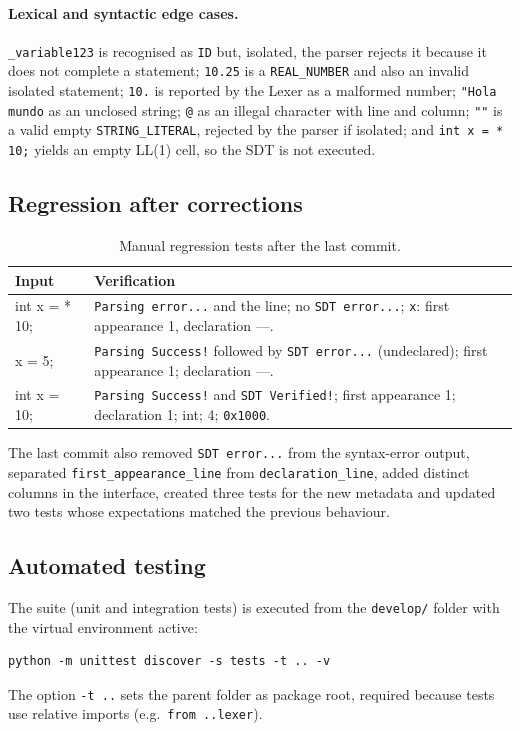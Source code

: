 \documentclass[11pt,a4paper]{article}
\begin{document}
\paragraph{Lexical and syntactic edge cases.}
\texttt{\_variable123} is recognised as \texttt{ID} but, isolated, the parser rejects it because it does not complete a statement; \texttt{10.25} is a \texttt{REAL\_NUMBER} and also an invalid isolated statement; \texttt{10.} is reported by the Lexer as a malformed number; \texttt{"Hola mundo} as an unclosed string; \texttt{@} as an illegal character with line and column; \texttt{""} is a valid empty \texttt{STRING\_LITERAL}, rejected by the parser if isolated; and \texttt{int x = * 10;} yields an empty LL(1) cell, so the SDT is not executed.

\subsection{Regression after corrections}
\begin{table}[H]
\centering
\small
\begin{tabularx}{\textwidth}{@{}>{\ttfamily}lX@{}}
\toprule
\textbf{Input} & \textbf{Verification}\\
\midrule
int x = * 10; & \texttt{Parsing error...} and the line; no \texttt{SDT error...}; \texttt{x}: first appearance 1, declaration ---.\\
x = 5; & \texttt{Parsing Success!} followed by \texttt{SDT error...} (undeclared); first appearance 1; declaration ---.\\
int x = 10; & \texttt{Parsing Success!} and \texttt{SDT Verified!}; first appearance 1; declaration 1; int; 4; \texttt{0x1000}.\\
\bottomrule
\end{tabularx}
\caption{Manual regression tests after the last commit.}
\end{table}

The last commit also removed \texttt{SDT error...} from the syntax-error output, separated \texttt{first\_appearance\_line} from \texttt{declaration\_line}, added distinct columns in the interface, created three tests for the new metadata and updated two tests whose expectations matched the previous behaviour.

\subsection{Automated testing}
The suite (unit and integration tests) is executed from the \texttt{develop/} folder with the virtual environment active:
\begin{lstlisting}
python -m unittest discover -s tests -t .. -v
\end{lstlisting}
The option \texttt{-t ..} sets the parent folder as package root, required because tests use relative imports (e.g.\ \texttt{from ..lexer}).
\end{document}
